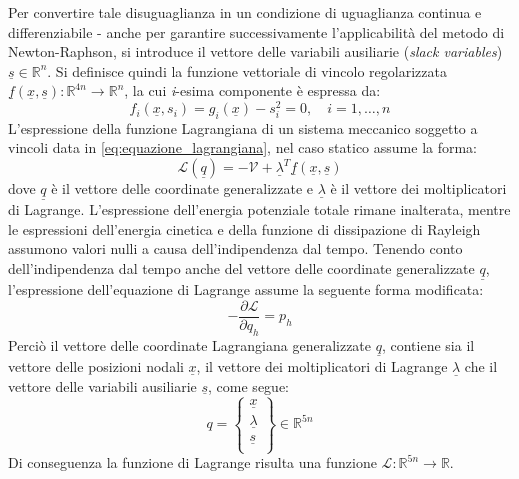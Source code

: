 Per convertire tale disuguaglianza in un condizione di uguaglianza continua e differenziabile - anche per garantire successivamente l'applicabilità del metodo di Newton-Raphson, si introduce il vettore delle variabili ausiliarie (\textit{slack variables}) $\underline{s} \in \mathbb{R}^{n}$. Si definisce quindi la funzione vettoriale di vincolo regolarizzata $\underline{f}(\underline{x}, \underline{s}) : \mathbb{R}^{4n} \to \mathbb{R}^n$, la cui \textit{i}-esima componente è espressa da: 
\begin{equation}
  f_i(\underline{x}, s_i) = g_i(\underline{x}) - s_i^2 = 0, \quad i = 1, \dots, n
\end{equation}
L'espressione della funzione Lagrangiana di un sistema meccanico soggetto a vincoli data in \eqref{eq:equazione_lagrangiana}, nel caso statico assume la forma: 
\begin{equation}
  \mathcal{L}(\underline{q}) = - \mathcal{V} + \underline{\lambda}^{T}\underline{f}(\underline{x}, \underline{s})
  \label{eq:funzione_lagrangiana_contatto_statico}
\end{equation}
dove $\underline{q}$ è il vettore delle coordinate generalizzate e $\underline{\lambda}$ è il vettore dei moltiplicatori di Lagrange. L'espressione dell'energia potenziale totale rimane inalterata, mentre le espressioni dell'energia cinetica e della funzione di dissipazione di Rayleigh assumono valori nulli a causa dell'indipendenza dal tempo. Tenendo conto dell'indipendenza dal tempo anche del vettore delle coordinate generalizzate $\underline{q}$, l'espressione dell'equazione di Lagrange assume la seguente forma modificata: 
\begin{equation}
   - \frac{\partial \mathcal{L}}{\partial  q_h} = p_h
  \label{eq:equazione_lagrangiana_contatto_statico}
\end{equation}
Perciò il vettore delle coordinate Lagrangiana generalizzate $\underline{q}$, contiene sia il vettore delle posizioni nodali $\underline{x}$, il vettore dei moltiplicatori di Lagrange $\underline{\lambda}$ che il vettore delle variabili ausiliarie $\underline{s}$, come segue:
\begin{equation} 
  q = \left\{
  \begin{array}{c}
    \underline{x}\\
    \underline{\lambda}\\
    \underline{s}\\
  \end{array}
  \right\} \in \mathbb{R}^{5n}
\end{equation}
Di conseguenza la funzione di Lagrange risulta una funzione $\mathcal{L} : \mathbb{R}^{5n} \to \mathbb{R}$.

